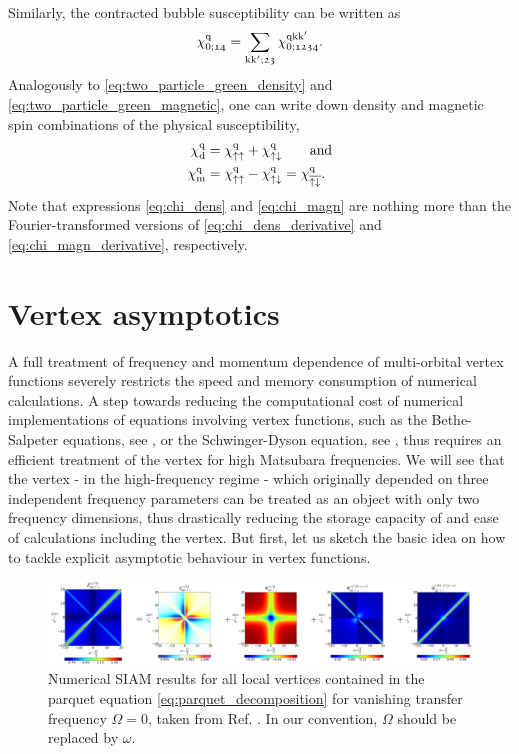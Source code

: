 \documentclass[../../main.tex]{subfiles}
\begin{document}
Similarly, the contracted bubble susceptibility can be written as
\begin{align}
	\chi_{0;\mathfrak{14}}^{\text{q}}=\sum_{\text{k}\text{k}';\mathfrak{23}}\chi_{0;\mathfrak{1234}}^{\text{q}\text{k}\text{k}'}.
\end{align}
Analogously to \eqref{eq:two_particle_green_density} and \eqref{eq:two_particle_green_magnetic}, one can write down density and magnetic spin combinations of the physical susceptibility,
\begin{subequations}
\begin{align}
	\chi_{\text{d}}^{\text{q}}&=\chi_{\uparrow\uparrow}^{\text{q}}+\chi_{\uparrow\downarrow}^{\text{q}}\qquad\text{and}\label{eq:chi_dens}\\
	\chi_{\text{m}}^{\text{q}}&=\chi_{\uparrow\uparrow}^{\text{q}}-\chi_{\uparrow\downarrow}^{\text{q}}=\chi_{\overline{\uparrow\downarrow}}^{\text{q}}.\label{eq:chi_magn}
\end{align}
\end{subequations}
Note that expressions \eqref{eq:chi_dens} and \eqref{eq:chi_magn} are nothing more than the Fourier-transformed versions of \eqref{eq:chi_dens_derivative} and \eqref{eq:chi_magn_derivative}, respectively.

\section{Vertex asymptotics}\label{sec:vertex_asymptotics}

A full treatment of frequency and momentum dependence of multi-orbital vertex functions severely restricts the speed and memory consumption of numerical calculations. A step towards reducing the computational cost of numerical implementations of equations involving vertex functions, such as the Bethe-Salpeter equations, see , or the Schwinger-Dyson equation, see , thus requires an efficient treatment of the vertex for high Matsubara frequencies. We will see that the vertex - in the high-frequency regime - which originally depended on three independent frequency parameters can be treated as an object with only two frequency dimensions, thus drastically reducing the storage capacity of and ease of calculations including the vertex. But first, let us sketch the basic idea on how to tackle explicit asymptotic behaviour in vertex functions.
\begin{figure}[ht!]
	\centering
	\includegraphics[width=\linewidth]{../../Graphics/vertex_asymptotics_paper.png}
	\caption{Numerical SIAM results for all local vertices contained in the parquet equation \eqref{eq:parquet_decomposition} for vanishing transfer frequency $\Omega=0$, taken from Ref. \cite{high-freq asympt}. In our convention, $\Omega$ should be replaced by $\omega$.}
	\label{fig:full_vertex_siam_results_paper}
\end{figure}
\end{document}
